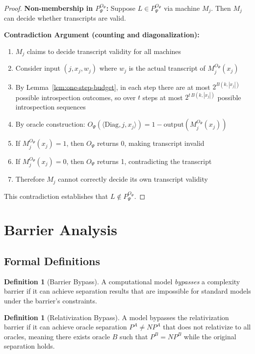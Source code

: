 \documentclass[11pt]{article}
\theoremstyle{definition}
\newtheorem{definition}[theorem]{Definition}
\newcommand{\len}[1]{\left|#1\right|}
\begin{document}
\begin{proof}
\textbf{Non-membership in $P^{O_\Psi}_\Psi$:}
Suppose $L \in P^{O_\Psi}_\Psi$ via machine $M_j$. Then $M_j$ can decide whether transcripts are valid.

\textbf{Contradiction Argument (counting and diagonalization):}
\begin{enumerate}
\item $M_j$ claims to decide transcript validity for all machines
\item Consider input $(j, x_j, w_j)$ where $w_j$ is the actual transcript of $M_j^{O_\Psi}(x_j)$
\item By Lemma~\ref{lem:one-step-budget}, in each step there are at most $2^{B(k,\len{x_j})}$ possible introspection outcomes, so over $t$ steps at most $2^{t\,B(k,\len{x_j})}$ possible introspection sequences
\item By oracle construction: $O_\Psi(\langle \text{Diag}, j, x_j \rangle) = 1 - \text{output}(M_j^{O_\Psi}(x_j))$
\item If $M_j^{O_\Psi}(x_j) = 1$, then $O_\Psi$ returns 0, making transcript invalid
\item If $M_j^{O_\Psi}(x_j) = 0$, then $O_\Psi$ returns 1, contradicting the transcript
\item Therefore $M_j$ cannot correctly decide its own transcript validity
\end{enumerate}

This contradiction establishes that $L \notin P^{O_\Psi}_\Psi$.
\end{proof}

\section{Barrier Analysis}

\subsection{Formal Definitions}

\begin{definition}[Barrier Bypass]
A computational model \textit{bypasses} a complexity barrier if it can achieve separation results that are impossible for standard models under the barrier's constraints.
\end{definition}

\begin{definition}[Relativization Bypass]
A model bypasses the relativization barrier if it can achieve oracle separation $P^A \neq NP^A$ that does not relativize to all oracles, meaning there exists oracle $B$ such that $P^B = NP^B$ while the original separation holds.
\end{definition}
\end{document}
